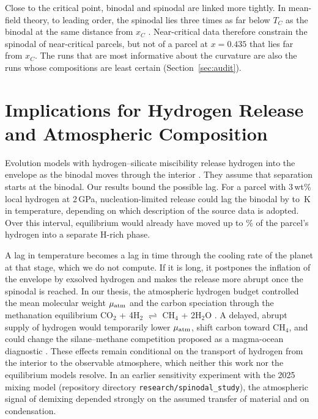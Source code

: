 Close to the critical point, binodal and spinodal are linked more tightly. In mean-field
theory, to leading order, the spinodal lies three times as far below $T_C$ as the binodal at
the same distance from $x_C$ \cite{debenedetti1996}. Near-critical data
therefore constrain the spinodal of near-critical parcels, but not of a parcel at
$x = 0.435$ that lies far from $x_C$. The runs that are most informative about the curvature
are also the runs whose compositions are least certain (Section~\ref{sec:audit}).

\section{Implications for Hydrogen Release and Atmospheric Composition}\label{sec:implications}

Evolution models with hydrogen--silicate miscibility release hydrogen into the envelope as the
binodal moves through the interior \cite{rogers2025,rogers2026,tejada2026}. They assume that
separation starts at the binodal. Our results bound the possible lag. For a parcel with
3\,wt\% local hydrogen at 2\,GPa, nucleation-limited release could lag the binodal by
\IntRangeLo{} to \pubIntTwo{}\,K in temperature, depending on which description of the source
data is adopted. Over this interval, equilibrium would already have moved up to \pubFhTwo{}\%
of the parcel's hydrogen into a separate H-rich phase.

A lag in temperature becomes a lag in time through the cooling rate of the planet at that
stage, which we do not compute. If it is long, it postpones the inflation of the envelope by
exsolved hydrogen and makes the release more abrupt once the spinodal is reached. In our
thesis, the atmospheric hydrogen budget controlled the mean molecular weight $\mu_{\rm atm}$
and the carbon speciation through the methanation equilibrium
CO$_2$ + 4H$_2$ $\rightleftharpoons$ CH$_4$ + 2H$_2$O \cite{laga2025}. A delayed, abrupt
supply of hydrogen would temporarily lower $\mu_{\rm atm}$, shift carbon toward CH$_4$, and
could change the silane--methane competition proposed as a magma-ocean diagnostic
\cite{hakim2026}. These effects remain conditional on the transport of hydrogen from the
interior to the observable atmosphere, which neither this work nor the equilibrium models
resolve. In an earlier sensitivity experiment with the 2025 mixing model (repository
directory \texttt{research/spinodal\_study}), the atmospheric signal of demixing depended
strongly on the assumed transfer of material and on condensation.

